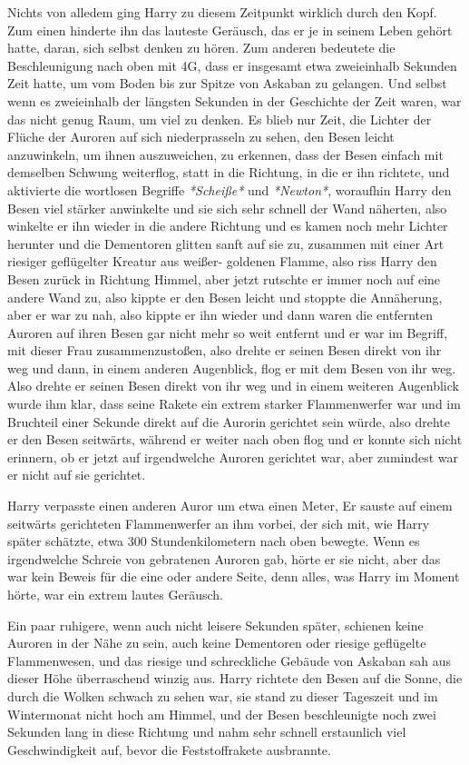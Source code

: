 Nichts von alledem ging Harry zu diesem Zeitpunkt wirklich durch den Kopf. Zum
einen hinderte ihn das lauteste Geräusch, das er je in seinem Leben gehört
hatte, daran, sich selbst denken zu hören. Zum anderen bedeutete die
Beschleunigung nach oben mit 4G, dass er insgesamt etwa zweieinhalb Sekunden
Zeit hatte, um vom Boden bis zur Spitze von Askaban zu gelangen. Und selbst wenn
es zweieinhalb der längsten Sekunden in der Geschichte der Zeit waren, war das
nicht genug Raum, um viel zu denken. Es blieb nur Zeit, die Lichter der Flüche
der Auroren auf sich niederprasseln zu sehen, den Besen leicht anzuwinkeln, um
ihnen auszuweichen, zu erkennen, dass der Besen einfach mit demselben Schwung
weiterflog, statt in die Richtung, in die er ihn richtete, und aktivierte die
wortlosen Begriffe \emph{*Scheiße*} und \emph{*Newton*}, woraufhin Harry den
Besen viel stärker anwinkelte und sie sich sehr schnell der Wand näherten, also
winkelte er ihn wieder in die andere Richtung und es kamen noch mehr Lichter
herunter und die Dementoren glitten sanft auf sie zu, zusammen mit einer Art
riesiger geflügelter Kreatur aus weißer- goldenen Flamme, also riss Harry den
Besen zurück in Richtung Himmel, aber jetzt rutschte er immer noch auf eine
andere Wand zu, also kippte er den Besen leicht und stoppte die Annäherung, aber
er war zu nah, also kippte er ihn wieder und dann waren die entfernten Auroren
auf ihren Besen gar nicht mehr so weit entfernt und er war im Begriff, mit
dieser Frau zusammenzustoßen, also drehte er seinen Besen direkt von ihr weg und
dann, in einem anderen Augenblick, flog er mit dem Besen von ihr weg. Also
drehte er seinen Besen direkt von ihr weg und in einem weiteren Augenblick wurde
ihm klar, dass seine Rakete ein extrem starker Flammenwerfer war und im
Bruchteil einer Sekunde direkt auf die Aurorin gerichtet sein würde, also drehte
er den Besen seitwärts, während er weiter nach oben flog und er konnte sich
nicht erinnern, ob er jetzt auf irgendwelche Auroren gerichtet war, aber
zumindest war er nicht auf sie gerichtet.

Harry verpasste einen anderen Auror um etwa einen Meter, Er sauste auf einem
seitwärts gerichteten Flammenwerfer an ihm vorbei, der sich mit, wie Harry
später schätzte, etwa 300 Stundenkilometern nach oben bewegte. Wenn es
irgendwelche Schreie von gebratenen Auroren gab, hörte er sie nicht, aber das
war kein Beweis für die eine oder andere Seite, denn alles, was Harry im Moment
hörte, war ein extrem lautes Geräusch.

Ein paar ruhigere, wenn auch nicht leisere Sekunden später, schienen keine
Auroren in der Nähe zu sein, auch keine Dementoren oder riesige geflügelte
Flammenwesen, und das riesige und schreckliche Gebäude von Askaban sah aus
dieser Höhe überraschend winzig aus. Harry richtete den Besen auf die Sonne, die
durch die Wolken schwach zu sehen war, sie stand zu dieser Tageszeit und im
Wintermonat nicht hoch am Himmel, und der Besen beschleunigte noch zwei Sekunden
lang in diese Richtung und nahm sehr schnell erstaunlich viel Geschwindigkeit
auf, bevor die Feststoffrakete ausbrannte.


